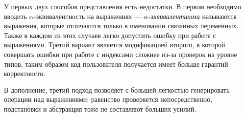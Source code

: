 У первых двух способов представления есть недостатки. В первом необходимо вводить $\alpha$-эквивалентность на выражениях --- \textit{$\alpha$-эквивалентными} называются выражения, которые отличаются только в именовании связанных переменных. Также в каждом из этих случаев легко допустить ошибку при работе с выражениями. Третий вариант является модификацией второго, в которой совершать ошибки при работе с индексами сложнее из-за проверок на уровне типов, таким образом код пользователя получается имеет больше гарантий корректности.

В дополнение, третий подход позволяет с большей легкостью генерировать операции над выражениями: равенство проверяется непосредственно, подстановки и абстракция тоже не составляют больших усилий.





